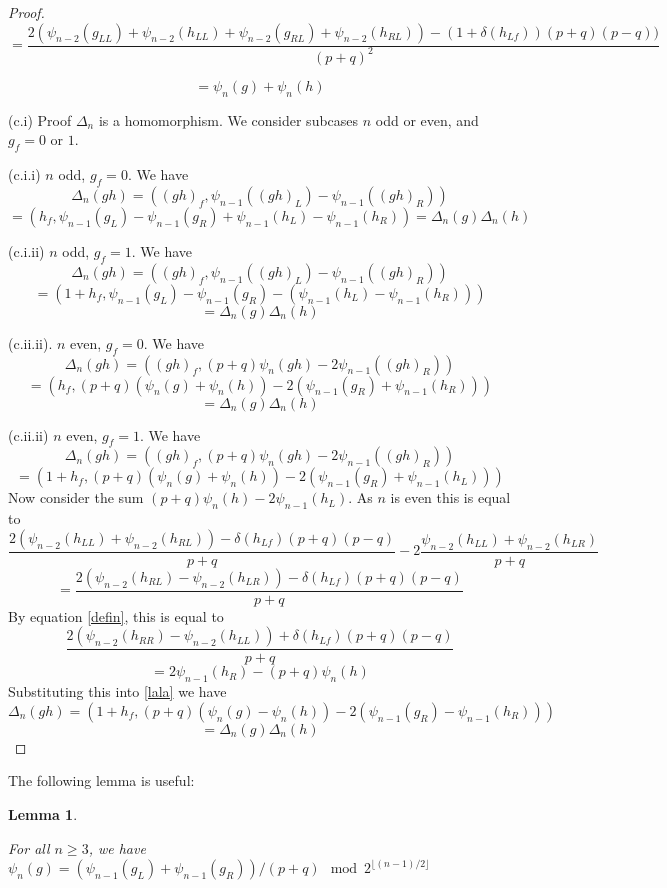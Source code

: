 \documentclass[11pt]{article}
\theoremstyle{plain}
\newtheorem{lemma}{Lemma}
\theoremstyle{definition}
\begin{document}
\begin{proof}
    $$ = \frac{2(\psi_{n-2}(g_{LL}) + \psi_{n-2}(h_{LL}) +  \psi_{n-2}(g_{RL}) + \psi_{n-2}(h_{RL})) - (1 + \delta(h_{Lf}))(p+q)(p-q)) }{(p+q)^2}$$

    $$= \psi_n(g) + \psi_n(h)$$
    
    \vspace{1em}

    (c.i) Proof $\Delta_n$ is a homomorphism. We consider subcases $n$ odd or even, and $g_f = 0$ or $1$. 

    (c.i.i) $n$ odd, $g_f = 0$. We have
    $$\Delta_n(gh) = ((gh)_f, \psi_{n-1}((gh)_L) - \psi_{n-1}((gh)_R))$$
    $$ = (h_f, \psi_{n-1}(g_L) - \psi_{n-1}(g_R) + \psi_{n-1}(h_L)  - \psi_{n-1}(h_R)) = \Delta_n(g)\Delta_n(h)$$

    (c.i.ii) $n$ odd, $g_f = 1$. We have 
    $$\Delta_n(gh) = ((gh)_f, \psi_{n-1}((gh)_L) - \psi_{n-1}((gh)_R))$$
    $$ = (1 + h_f, \psi_{n-1}(g_L) - \psi_{n-1}(g_R) - (\psi_{n-1}(h_L) - \psi_{n-1}(h_R)))$$
    $$ = \Delta_n(g)\Delta_n(h)$$

    (c.ii.ii). $n$ even, $g_f = 0$. We have 
    $$\Delta_n(gh) = ((gh)_f, (p+q)\psi_{n}(gh) - 2\psi_{n-1}((gh)_R))$$
    $$= (h_f, (p+q)(\psi_{n}(g) + \psi_n(h)) - 2(\psi_{n-1}(g_R) + \psi_{n-1}(h_R)))$$
    $$= \Delta_n(g)\Delta_n(h)$$

    (c.ii.ii) $n$ even, $g_f = 1$. We have
    $$\Delta_n(gh) = ((gh)_f, (p+q)\psi_{n}(gh) - 2\psi_{n-1}((gh)_R))$$
    \begin{equation}\label{lala} = (1+h_f, (p+q)(\psi_{n}(g) + \psi_n(h)) - 2(\psi_{n-1}(g_R) + \psi_{n-1}(h_L)))\end{equation}
    Now consider the sum $(p+q)\psi_n(h) - 2\psi_{n-1}(h_L)$. As $n$ is even this is equal to 
    $$\frac{2(\psi_{n-2}(h_{LL}) + \psi_{n-2}(h_{RL})) - \delta(h_{Lf})(p+q)(p-q)}{p+q} - 2\frac{\psi_{n-2}(h_{LL}) + \psi_{n-2}(h_{LR})}{p+q}$$
    $$=\frac{2(\psi_{n-2}(h_{RL}) - \psi_{n-2}(h_{LR})) - \delta(h_{Lf})(p+q)(p-q)}{p+q}$$
    By equation \ref{defin}, this is equal to
    $$\frac{2(\psi_{n-2}(h_{RR}) - \psi_{n-2}(h_{LL})) + \delta(h_{Lf})(p+q)(p-q)}{p+q}$$
    $$ = 2\psi_{n-1}(h_R) - (p+q)\psi_n(h)$$
    Substituting this into \ref{lala} we have 
    $$\Delta_n(gh) = (1+h_f, (p+q)(\psi_n(g) - \psi_n(h)) - 2(\psi_{n-1}(g_R) - \psi_{n-1}(h_R)))$$
    $$ = \Delta_n(g)\Delta_n(h)$$

\end{proof}

The following lemma is useful:

\begin{lemma} \label{mod}

For all $n \geq 3$, we have $ \psi_n(g) = (\psi_{n-1}(g_L) + \psi_{n-1}(g_R))/(p+q) \mod{2^{\lfloor (n-1)/2 \rfloor}}$
    
\end{lemma}
\end{document}
